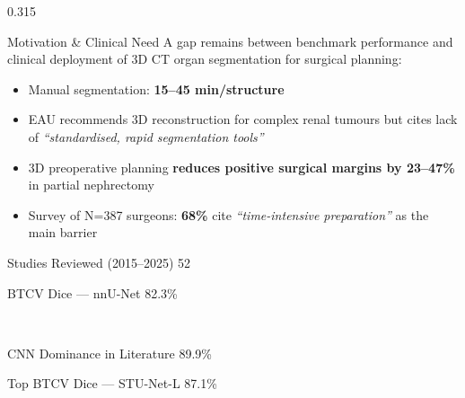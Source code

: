 \documentclass[final,t]{beamer}
\begin{document}
\begin{frame}[t]
\vspace{0.05cm}
\begin{columns}[t,totalwidth=\textwidth]

\begin{column}{0.315\textwidth}

\begin{pblock}{Motivation \& Clinical Need}
\RaggedRight
A gap remains between benchmark performance and clinical deployment
of 3D CT organ segmentation for surgical planning:

\begin{itemize}\setlength\itemsep{2pt}
  \item Manual segmentation: \textbf{15--45 min/structure}
  \item EAU recommends 3D reconstruction for complex renal tumours but cites
        lack of \textit{``standardised, rapid segmentation tools''}
  \item 3D preoperative planning \textbf{reduces positive surgical margins by
        23--47\%} in partial nephrectomy
  \item Survey of N=387 surgeons: \textbf{68\%} cite
        \textit{``time-intensive preparation''} as the main barrier
\end{itemize}

\vspace{0.2em}
\begin{center}
  \begin{minipage}[t]{0.48\linewidth}
    \begin{statchip}{Studies Reviewed (2015--2025)}
      52
    \end{statchip}
  \end{minipage}\hfill
  \begin{minipage}[t]{0.48\linewidth}
    \begin{statchip}{BTCV Dice --- nnU-Net}
      82.3\%
    \end{statchip}
  \end{minipage}\\[0.5em]
  \begin{minipage}[t]{0.48\linewidth}
    \begin{statchip}{CNN Dominance in Literature}
      89.9\%
    \end{statchip}
  \end{minipage}\hfill
  \begin{minipage}[t]{0.48\linewidth}
    \begin{statchip}{Top BTCV Dice --- STU-Net-L}
      87.1\%
    \end{statchip}
  \end{minipage}
\end{center}
\end{pblock}


\end{column}
\end{columns}
\end{frame}
\end{document}
